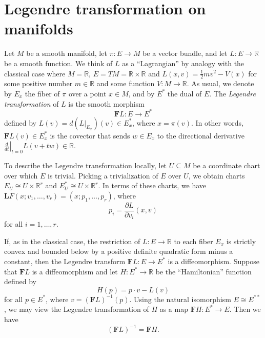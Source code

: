 \documentclass{article}
\author{Lucas Braune}
\providecommand{\R}{\mathbb R}
\providecommand{\F}{\mathbf F}
\begin{document}
\section*{Legendre transformation on manifolds}

Let $M$ be a smooth manifold, let $\pi : E\to M$ be a vector bundle, and let $L : E\to \R$ be a smooth function.
We think of $L$ as a ``Lagrangian'' by analogy with the classical case where $M = \R$, $E = TM = \R\times \R$ and $L(x,v) = \frac 1 2 m v^2 - V(x)$ for some positive number $m\in \R$ and some function $V : M \to \R$.
As usual, we denote by $E_x$ the fiber of $\pi$ over a point $x\in M$, and by $E^*$ the dual of $E$.
The \emph{Legendre transformation} of $L$ is the smooth morphism
$$\F L : E \to E^*$$
defined by 
$L(v) = d(L|_{E_x})(v) \in E_x^*$,
where $x = \pi(v)$.
In other words, $\F L(v)\in E_x^*$ is the covector that sends $w\in E_x$ to the directional derivative $\left.\frac d {dt}\right|_{t=0} L(v + tw)\in \R$.

To describe the Legendre transformation locally, let $U\subseteq M$ be a coordinate chart over which $E$ is trivial.
Picking a trivialization of $E$ over $U$, we obtain charts $E_U \cong U \times \R^r$ and $E_U^* \cong U \times \R^r$.
In terms of these charts, we have $\mathbf L F(x; v_1,\dotsc, v_r) = (x; p_1,\dotsc, p_r)$, where
$$p_i = \frac {\partial L}{\partial v_i}(x,v)$$
for all $i=1,\dots, r$.

If, as in the classical case, the restriction of $L : E\to \R$ to each fiber $E_x$ is strictly convex and bounded below by a positive definite quadratic form minus a constant, then the Legendre transform $\F L : E\to E^*$ is a diffeomorphism.
Suppose that $\F L$ is a diffeomorphism and let $H : E^* \to \R$ be the ``Hamiltonian'' function defined by
$$H(p) = p \cdot v - L(v)$$
for all $p\in E^*$, where $v = (\F L)^{-1}(p)$.
Using the natural isomorphism $E\cong E^{**}$, we may view the Legendre transformation of $H$ as a map $\F H : E^* \to E$.
Then we have
$$(\F L)^{-1} = \F H.$$
\end{document}
